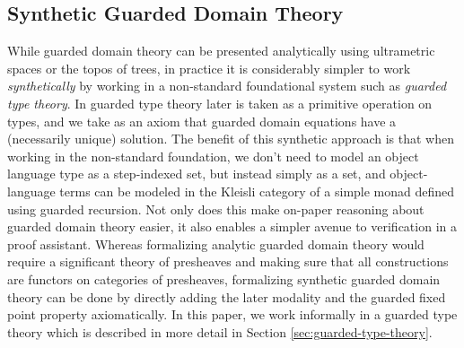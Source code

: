 

\subsection{Synthetic Guarded Domain Theory}

While guarded domain theory can be presented analytically using
ultrametric spaces or the topos of trees, in practice it is
considerably simpler to work \emph{synthetically} by working in a
non-standard foundational system such as \emph{guarded type
theory}. In guarded type theory later is taken as a primitive
operation on types, and we take as an axiom that guarded domain
equations have a (necessarily unique) solution. The benefit of this
synthetic approach is that when working in the non-standard
foundation, we don't need to model an object language type as a
step-indexed set, but instead simply as a set, and object-language
terms can be modeled in the Kleisli category of a simple monad defined
using guarded recursion. Not only does this make on-paper reasoning
about guarded domain theory easier, it also enables a simpler avenue
to verification in a proof assistant. Whereas formalizing analytic
guarded domain theory would require a significant theory of presheaves
and making sure that all constructions are functors on categories of
presheaves, formalizing synthetic guarded domain theory can be done by
directly adding the later modality and the guarded fixed point
property axiomatically.
%
%
In this paper, we work informally in a guarded type theory which is described in
more detail in Section \ref{sec:guarded-type-theory}.

